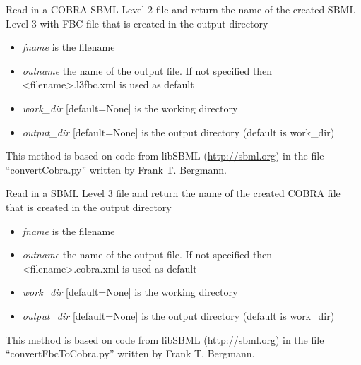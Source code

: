 \documentclass[a4paper,11pt,english]{sphinxmanual}
\begin{document}
\begin{fulllineitems}
\label{modules_doc:cbmpy.CBXML.sbml_convertCOBRASBMLtoFBC}
Read in a COBRA SBML Level 2 file and return the name of the created SBML Level 3 with FBC
file that is created in the output directory
\begin{itemize}
\item {} 
\emph{fname} is the filename

\item {} 
\emph{outname} the name of the output file. If not specified then \textless{}filename\textgreater{}.l3fbc.xml is used as default

\item {} 
\emph{work\_dir} {[}default=None{]} is the working directory

\item {} 
\emph{output\_dir} {[}default=None{]} is the output directory (default is work\_dir)

\end{itemize}

This method is based on code from libSBML (\href{http://sbml.org}{http://sbml.org}) in the file ``convertCobra.py''
written by Frank T. Bergmann.

\end{fulllineitems}


\begin{fulllineitems}
\label{modules_doc:cbmpy.CBXML.sbml_convertSBML3FBCToCOBRA}
Read in a SBML Level 3 file and return the name of the created COBRA
file that is created in the output directory
\begin{itemize}
\item {} 
\emph{fname} is the filename

\item {} 
\emph{outname} the name of the output file. If not specified then \textless{}filename\textgreater{}.cobra.xml is used as default

\item {} 
\emph{work\_dir} {[}default=None{]} is the working directory

\item {} 
\emph{output\_dir} {[}default=None{]} is the output directory (default is work\_dir)

\end{itemize}

This method is based on code from libSBML (\href{http://sbml.org}{http://sbml.org}) in the file ``convertFbcToCobra.py''
written by Frank T. Bergmann.

\end{fulllineitems}
\end{document}
